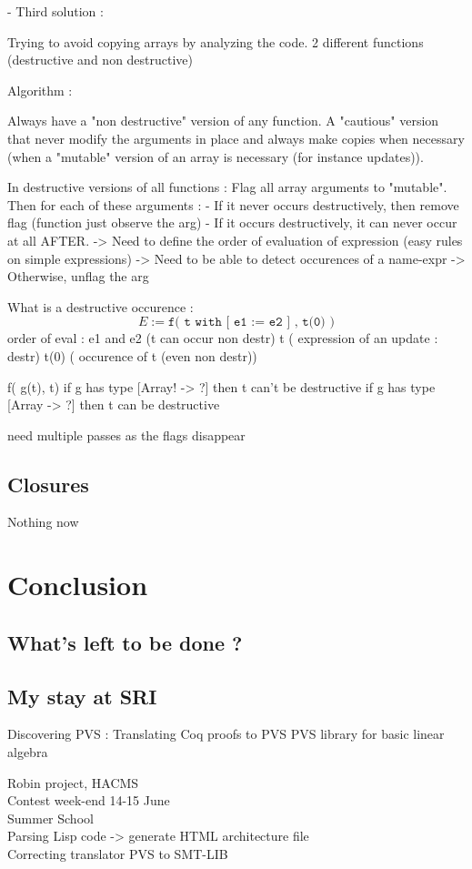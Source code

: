 \documentclass[12pt,a4paper,titlepage]{article}
\newcommand{\codeline}[1]{\texttt{#1}}
\begin{document}
- Third solution :

Trying to avoid copying arrays by analyzing the code.
2 different functions (destructive and non destructive)


Algorithm :

Always have a "non destructive" version of any function. A "cautious" version that never modify the arguments in place and always make copies when necessary (when a "mutable" version of an array is necessary (for instance updates)).

In destructive versions of all functions :
Flag all array arguments to "mutable".
Then for each of these arguments :
  - If it never occurs destructively, then remove flag
          (function just observe the arg)
  - If it occurs destructively, it can never occur at all AFTER.
  -> Need to define the order of evaluation of expression
      (easy rules on simple expressions)
  -> Need to be able to detect occurences of a name-expr
  -> Otherwise, unflag the arg

What is a destructive occurence :
$$ E :=  \codeline{f(  t with [ e1 := e2 ] , t(0) )} $$
order of eval :
e1 and e2  (t can occur non destr)
t          ( expression of an update : destr)
t(0)       ( occurence of t (even non destr))

f( g(t), t)
if g has type [Array! -> ?] then t can't be destructive
if g has type [Array  -> ?] then t can be destructive

need multiple passes as the flags disappear





\subsection{Closures}

Nothing now


\section{Conclusion}

\subsection{What's left to be done ?}

\subsection{My stay at SRI}

Discovering PVS :
Translating Coq proofs to PVS
PVS library for basic linear algebra

Robin project, HACMS \\
Contest week-end 14-15 June \\
Summer School \\
Parsing Lisp code -> generate HTML architecture file\\
Correcting translator PVS to SMT-LIB






\end{document}

